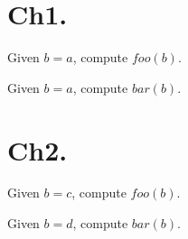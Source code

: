 \documentclass[]{scrreprt}
\begin{document}
\chapter{Ch1.}

   \begin{Exercise}[title={compute foo},label={ch1:problem:foo}]
   Given $b=a$, compute $foo(b)$.
   \end{Exercise}

   \begin{Exercise}[title={compute bar},label={ch1:problem:bar}]
   Given $b=a$, compute $bar(b)$.
   \end{Exercise}

\chapter{Ch2.}

   \begin{Exercise}[title={compute foo},label={ch2:problem:foo}]
   Given $b=c$, compute $foo(b)$.
   \end{Exercise}

   \begin{Exercise}[title={compute bar},label={ch2:problem:bar}]
   Given $b=d$, compute $bar(b)$.
   \end{Exercise}
\end{document}
